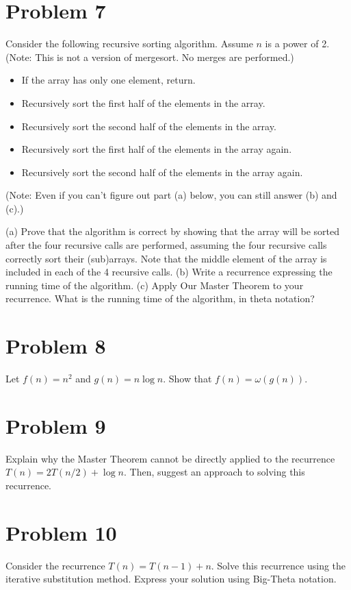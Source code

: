 \documentclass{article}
\begin{document}
\section*{Problem 7}
Consider the following recursive sorting algorithm. Assume $n$ is a power of 2. (Note: This is not a version of mergesort. No merges are performed.)
\begin{itemize}
    \item If the array has only one element, return.
    \item Recursively sort the first half of the elements in the array.
    \item Recursively sort the second half of the elements in the array.
    \item Recursively sort the first half of the elements in the array again.
    \item Recursively sort the second half of the elements in the array again.
\end{itemize}
(Note: Even if you can’t figure out part (a) below, you can still answer (b) and (c).)

(a) Prove that the algorithm is correct by showing that the array will be sorted after the four recursive calls are performed, assuming the four recursive calls correctly sort their (sub)arrays. Note that the middle element of the array is included in each of the 4 recursive calls.
(b) Write a recurrence expressing the running time of the algorithm.
(c) Apply Our Master Theorem to your recurrence. What is the running time of the algorithm, in theta notation?


\section*{Problem 8}
Let $f(n) = n^2$ and $g(n) = n \log n$.  Show that $f(n) = \omega(g(n))$.

\section*{Problem 9}
Explain why the Master Theorem cannot be directly applied to the recurrence $T(n) = 2T(n/2) + \log n$.  Then, suggest an approach to solving this recurrence.

\section*{Problem 10}
Consider the recurrence $T(n) = T(n-1) + n$.  Solve this recurrence using the iterative substitution method.  Express your solution using Big-Theta notation.
\end{document}
